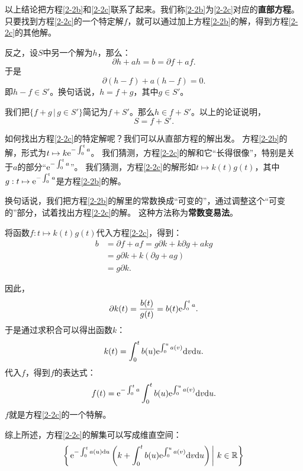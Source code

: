 \documentclass[12pt,UTF8,fontset=none]{ctexbook}
\begin{document}
以上结论把方程\eqref{2-2b}和\eqref{2-2c}联系了起来。我们称\eqref{2-2b}为\eqref{2-2c}对应的\textbf{直部方程}。
只要找到方程\eqref{2-2c}的一个特定解$f$，就可以通过加上方程\eqref{2-2b}的解，得到方程\eqref{2-2c}的其他解。

反之，设$S$中另一个解为$h$，那么：
$$ \partial h + a h = b = \partial f + a f. $$
于是
$$ \partial (h - f) + a (h - f) = 0. $$
即$h - f \in S'$。换句话说，$h = f + g$，其中$g\in S'$。

我们把$\{f + g \, | \, g\in S'\}$简记为$f + S'$。那么$h\in f + S'$。以上的论证说明，
$$S = f + S'. $$

如何找出方程\eqref{2-2c}的特定解呢？我们可以从直部方程的解出发。
方程\eqref{2-2b}的解，形式为$t\mapsto k\mathrm{e}^{-\int_0^t a}$。
我们猜测，方程\eqref{2-2c}的解和它“长得很像”，特别是关于$a$的部分“$\mathrm{e}^{-\int_0^t a}$”。
我们猜测，方程\eqref{2-2c}的解形如$t\mapsto k(t) g(t)$，其中$g: t\mapsto \mathrm{e}^{-\int_0^t a}$是方程\eqref{2-2b}的解。

换句话说，我们把方程\eqref{2-2b}的解里的常数换成“可变的”，通过调整这个“可变的”部分，试着找出方程\eqref{2-2c}的解。
这种方法称为\textbf{常数变易法}。

将函数$f: t\mapsto k(t) g(t)$代入方程\eqref{2-2c}，得到：
\begin{align*}
    b &= \partial f + a f = g \partial k + k \partial g + a k g \\
    &= g\partial k + k (\partial g + a g) \\
    &= g\partial k.
\end{align*}

因此，
$$ \partial k(t) = \frac{b(t)}{g(t)} = b(t) \mathrm{e}^{\int_0^t a}. $$
于是通过求积合可以得出函数$k$：
$$ k(t) = \int_0^t b(u) \mathrm{e}^{\int_0^u a(v)}\mathrm{d}v \mathrm{d}u. $$
代入$f$，得到$f$的表达式：
$$ f(t) = \mathrm{e}^{-\int_0^t a} \int_0^t b(u) \mathrm{e}^{\int_0^u a(v)}\mathrm{d}v \mathrm{d}u. $$
$f$就是方程\eqref{2-2c}的一个特解。

综上所述，方程\eqref{2-2c}的解集可以写成维直空间：
$$\left\{\left.\mathrm{e}^{-\int_0^t a(u)\mathrm{d}u} \left(k + \int_0^t b(u) \mathrm{e}^{\int_0^u a(v)}\mathrm{d}v \mathrm{d}u\right) \, \right| \, k\in \mathbb{R}\right\}$$
\end{document}
